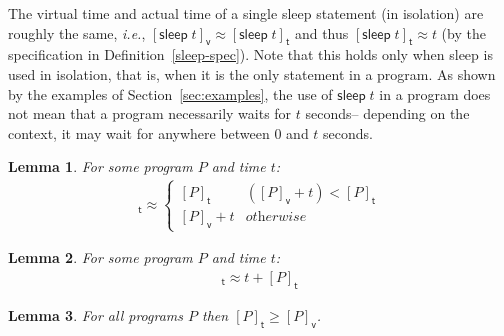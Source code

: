 \documentclass[preprint]{sigplanconf}
\renewcommand{\geq}{\geqslant}
\newcommand{\note}[1]{{\color{blue}{#1}}}
\newtheorem{lemma}{Lemma}
\theoremstyle{definition}
\newcommand{\sleep}{\mathsf{sleep}\;}
\newcommand{\sleepOp}{\textsf{sleep}}
\newcommand{\ksleepOp}{\textsf{kernelSleep}}
\newcommand{\vtime}[1]{[#1]_{\mathsf{v}}}
\newcommand{\etime}[1]{[#1]_{\mathsf{t}}}
\newcommand{\ie}{\emph{i.e.}}
\begin{document}
\note{Discuss this further, may be
  able to say later that in some cases $\epsilon$ is the scheduling
  time for play statments?} 

The virtual time and actual time of a single sleep statement (in
isolation) are roughly the same, \ie{}, $\vtime{\sleep t} \approx
\etime{\sleep t}$ and thus $\etime{\sleep t} \approx t$ (by the
specification in Definition~\ref{sleep-spec}). Note that this holds
only when \sleepOp{} is used in isolation, that is, when it is the
only statement in a program. As shown by the examples of
Section~\ref{sec:examples}, the use of $\sleep t$ in a program does
not mean that a program necessarily waits for $t$ seconds-- depending
on the context, it may wait for anywhere between $0$ and $t$ seconds.
 

\begin{lemma}
For some program $P$ and time $t$: 
\begin{align*}
\etime{P; \sleep{} t} \approx
 \begin{cases}
   \etime{P} & (\vtime{P} + t) < \etime{P} \\
   \vtime{P} + t  & \textit{otherwise}
 \end{cases}
\end{align*}
\label{lem:sleep-R}
\end{lemma}

\begin{lemma}
For some program $P$ and time $t$:
\begin{align*}
\etime{\sleep{} t; P} \approx t + \etime{P}
\end{align*}
\label{lem:sleep-L}
\end{lemma}

\begin{lemma}
For all programs $P$ then $\etime{P} \geq \vtime{P}$. 
\label{lemma-rel-etime-vtime}
\end{lemma}
\end{document}
